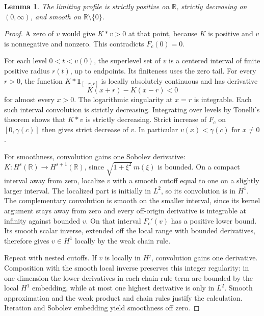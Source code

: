 \documentclass[11pt,a4paper]{article}
\newtheorem{lemma}[theorem]{Lemma}
\theoremstyle{remark}
\newcommand{\R}{\mathbb R}
\begin{document}
\begin{lemma}\label{lem:strict-smooth}
The limiting profile is strictly positive on $\R$, strictly decreasing
on $(0,\infty)$, and smooth on $\R\setminus\{0\}$.
\end{lemma}
\begin{proof}
A zero of $v$ would give $K*v>0$ at that point, because $K$ is positive
and $v$ is nonnegative and nonzero. This contradicts $F_c(0)=0$.

For each level $0<t<v(0)$, the superlevel set of $v$ is a centered
interval of finite positive radius $r(t)$, up to endpoints. Its finiteness
uses the zero tail. For every $r>0$, the function
$K*\mathbf1_{[-r,r]}$ is locally absolutely continuous and has derivative
\[
 K(x+r)-K(x-r)<0
\]
for almost every $x>0$. The logarithmic singularity at $x=r$ is
integrable. Each such interval convolution is strictly decreasing.
Integrating over levels by Tonelli's theorem shows that $K*v$ is strictly
decreasing. Strict increase of $F_c$ on $[0,\gamma(c)]$ then gives
strict decrease of $v$. In particular $v(x)<\gamma(c)$ for $x\ne0$.

For smoothness, convolution gains one Sobolev derivative:
$K:H^s(\R)\to H^{s+1}(\R)$, since
$\sqrt{1+\xi^2}\,m(\xi)$ is bounded. On a compact
interval away from zero, localize $v$ with a smooth cutoff equal to one
on a slightly larger interval. The localized part is initially in $L^2$,
so its convolution is in $H^1$. The complementary convolution is smooth
on the smaller interval, since its kernel argument stays away from zero
and every off-origin derivative is integrable at infinity against bounded
$v$. On that interval $F_c'(v)$ has a positive lower bound. Its smooth
scalar inverse, extended off the local range with bounded derivatives,
therefore gives $v\in H^1$ locally by the weak chain rule.

Repeat with nested cutoffs. If $v$ is locally in $H^j$, convolution gains
one derivative. Composition with the smooth local inverse preserves this
integer regularity: in one dimension the lower derivatives in each
chain-rule term are bounded by the local $H^1$ embedding, while at most
one highest derivative is only in $L^2$. Smooth approximation and the
weak product and chain rules justify the calculation. Iteration and
Sobolev embedding yield smoothness off zero.
\end{proof}
\end{document}
